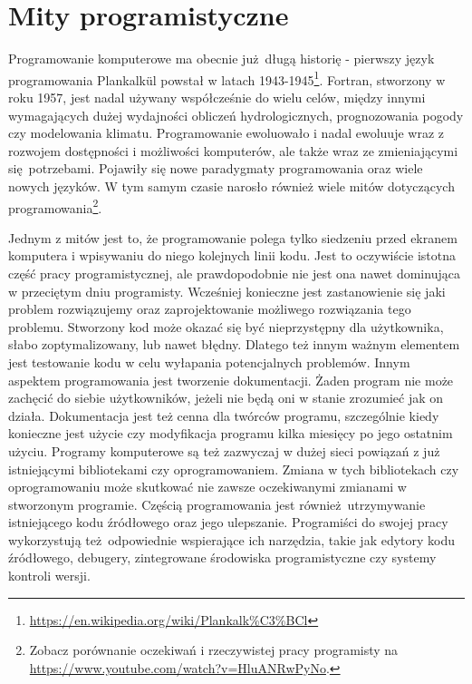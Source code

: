 \documentclass[paper=6in:9in,pagesize=pdftex,headinclude=on,footinclude=on,10pt]{scrbook}
\begin{document}
\hypertarget{mity-programistyczne}{%
\section{Mity programistyczne}\label{mity-programistyczne}}

Programowanie komputerowe ma obecnie już~długą historię - pierwszy język programowania Plankalkül powstał w latach 1943-1945\footnote{\url{https://en.wikipedia.org/wiki/Plankalk\%C3\%BCl}}.
Fortran, stworzony w roku 1957, jest nadal używany współcześnie do wielu celów, między innymi wymagających dużej wydajności obliczeń hydrologicznych, prognozowania pogody czy modelowania klimatu.
Programowanie ewoluowało i nadal ewoluuje wraz z rozwojem dostępności i możliwości komputerów, ale także wraz ze zmieniającymi się~potrzebami.
Pojawiły się nowe paradygmaty programowania oraz wiele nowych języków.
W tym samym czasie narosło również wiele mitów dotyczących programowania\footnote{Zobacz porównanie oczekiwań i rzeczywistej pracy programisty na \url{https://www.youtube.com/watch?v=HluANRwPyNo}.}.

Jednym z mitów jest to, że programowanie polega tylko siedzeniu przed ekranem komputera i wpisywaniu do niego kolejnych linii kodu.
Jest to oczywiście istotna część pracy programistycznej, ale prawdopodobnie nie jest ona nawet dominująca w przeciętym dniu programisty.
Wcześniej konieczne jest zastanowienie się jaki problem rozwiązujemy oraz zaprojektowanie możliwego rozwiązania tego problemu.
Stworzony kod może okazać się być nieprzystępny dla użytkownika, słabo zoptymalizowany, lub nawet błędny.
Dlatego też innym ważnym elementem jest testowanie kodu w celu wyłapania potencjalnych problemów.
Innym aspektem programowania jest tworzenie dokumentacji.
Żaden program nie może zachęcić do siebie użytkowników, jeżeli nie będą oni w stanie zrozumieć jak on działa.
Dokumentacja jest też cenna dla twórców programu, szczególnie kiedy konieczne jest użycie czy modyfikacja programu kilka miesięcy po jego ostatnim użyciu.
Programy komputerowe są też zazwyczaj w dużej sieci powiązań z już istniejącymi bibliotekami czy oprogramowaniem.
Zmiana w tych bibliotekach czy oprogramowaniu może skutkować nie zawsze oczekiwanymi zmianami w stworzonym programie.
Częścią programowania jest również~utrzymywanie istniejącego kodu źródłowego oraz jego ulepszanie.
Programiści do swojej pracy wykorzystują też~odpowiednie wspierające ich narzędzia, takie jak edytory kodu źródłowego, debugery, zintegrowane środowiska programistyczne czy systemy kontroli wersji.
\end{document}
